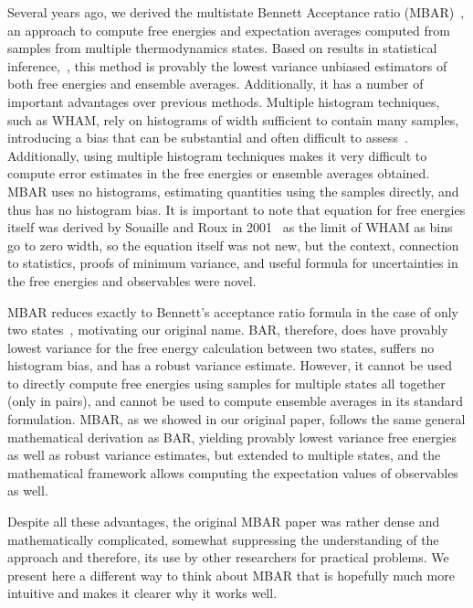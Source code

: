 \documentclass[aps,pre,twocolumn,superscriptaddress]{revtex4-1}
\begin{document}
Several years ago, we derived the multistate Bennett Acceptance ratio
(MBAR)~\cite{shirts-chodera:jcp:2008:mbar}, an approach to compute free energies and expectation averages
computed from samples from multiple thermodynamics states.  Based on
results in statistical
inference,~\cite{vardi:1985,gill:1988,kong:2003,tan:2004}, this method
is provably the lowest variance unbiased estimators of both free
energies and ensemble averages.  Additionally, it has a number of
important advantages over previous methods.  Multiple
histogram techniques, such as WHAM, rely on histograms of width
sufficient to contain many samples, introducing a bias that can be
substantial and often difficult to
assess~\cite{kobrak:j-comput-chem:2003:histogram-error}.
Additionally, using multiple histogram techniques makes it very
difficult to compute error estimates in the free energies or ensemble
averages obtained.  MBAR uses no histograms, estimating quantities
using the samples directly, and thus has no histogram bias.  It is
important to note that equation for free energies itself was derived
by Souaille and Roux in 2001~\cite{souaille:2001a} as the limit of WHAM as
bins go to zero width, so the equation itself was not new, but the
context, connection to statistics, proofs of minimum variance, and
useful formula for uncertainties in the free energies and observables
were novel.

MBAR reduces exactly to Bennett's acceptance ratio formula in the case
of only two states~\cite{bennett:1976}, motivating our original name.
BAR, therefore, does have provably lowest variance for the free energy
calculation between two states, suffers no histogram bias, and has a
robust variance estimate.  However, it cannot be used to directly
compute free energies using samples for multiple states all together
(only in pairs), and cannot be used to compute ensemble averages in
its standard formulation.  MBAR, as we showed in our original paper,
follows the same general mathematical derivation as BAR, yielding
provably lowest variance free energies as well as robust variance
estimates, but extended to multiple states, and the mathematical
framework allows computing the expectation values of observables as
well.

Despite all these advantages, the original MBAR paper was rather dense
and mathematically complicated, somewhat suppressing the understanding
of the approach and therefore, its use by other researchers for
practical problems. We present here a different way to think about
MBAR that is hopefully much more intuitive and makes it clearer why it
works well.
\end{document}
